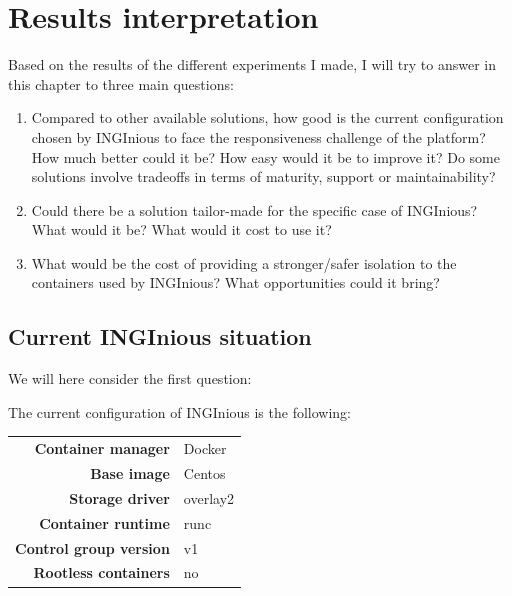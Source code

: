 \chapter{Results interpretation}

Based on the results of the different experiments I made, I will try to answer in this chapter to three main questions:
\begin{enumerate}
  \item Compared to other available solutions, how good is the current configuration chosen by INGInious to face the responsiveness challenge of the platform?  How much better could it be?  How easy would it be to improve it?  Do some solutions involve tradeoffs in terms of maturity, support or maintainability?
  \item Could there be a solution tailor-made for the specific case of INGInious?  What would it be?  What would it cost to use it?
  \item What would be the cost of providing a stronger/safer isolation to the containers used by INGInious?  What opportunities could it bring?
\end{enumerate}

\section{Current INGInious situation}
We will here consider the first question:
\begin{center}
\end{center}

The current configuration of INGInious is the following:
\begin{center}
\begin{tabular}{rl}
  \textbf{Container manager} & Docker \\
  \textbf{Base image} & Centos \\
  \textbf{Storage driver} & overlay2 \\
  \textbf{Container runtime} & runc \\
  \textbf{Control group version} & v1 \\
  \textbf{Rootless containers} & no \\
\end{tabular}
\end{center}

